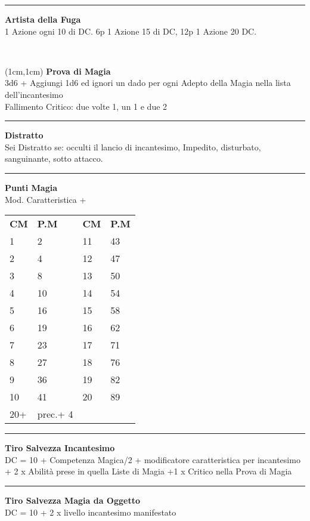 \documentclass[a4paper,12 pt,openany]{book}
\newcommand{\riga}{\rule{\textwidth}{0.4pt}}
\begin{document}
\begin{textblock*}{7cm}
\riga

\textbf{Artista della Fuga}\\
1 Azione ogni 10 di DC. 6p 1 Azione 15 di DC, 12p 1 Azione 20 DC.

\end{textblock*}

~\newpage

\begin{textblock*}{5cm}(1cm,1cm) %
\textbf{Prova di Magia}\\
3d6 + Aggiungi 1d6 ed ignori un dado per ogni Adepto della Magia nella lista dell'incantesimo\\
Fallimento Critico: due volte 1, un 1 e due 2\\


\riga

\textbf{Distratto}\\
Sei Distratto se: occulti il lancio di incantesimo, Impedito, disturbato, sanguinante, sotto attacco.\\

\riga

\textbf{Punti Magia}\\
Mod. Caratteristica + \\

\begin{tabular}{ll|ll}
\textbf{CM} & \textbf{P.M}&	\textbf{CM} & \textbf{P.M}\\
	1&	2 	&11&43\\
2&	4	&12&47\\
3&	8	&13&50\\
4&	10	&14&54\\
5&	16	&15&58\\
6&	19	&16&62\\
7&	23	&17&71\\
8&	27	&18&76\\
9&	36	&19&82\\
10&	41	&20&89\\
20+&prec.+ 4&&\\
\end{tabular}

\riga

\textbf{Tiro Salvezza Incantesimo}\\
DC = 10 + Competenza Magica/2 + modificatore caratteristica per incantesimo + 2 x Abilità prese in quella Liste di Magia +1 x Critico nella Prova di Magia

\riga

\textbf{Tiro Salvezza Magia da Oggetto}\\
DC = 10 + 2 x livello incantesimo manifestato


\end{textblock*}
\end{document}
